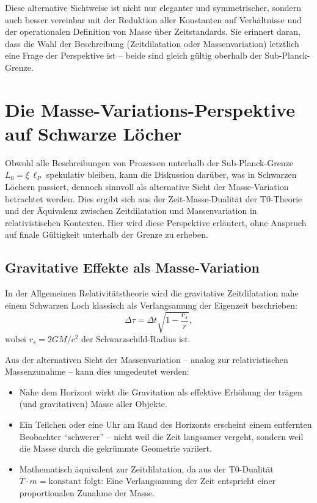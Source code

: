 Diese alternative Sichtweise ist nicht nur eleganter und symmetrischer, sondern auch besser vereinbar mit der Reduktion aller Konstanten auf Verhältnisse und der operationalen Definition von Masse über Zeitstandards. Sie erinnert daran, dass die Wahl der Beschreibung (Zeitdilatation oder Massenvariation) letztlich eine Frage der Perspektive ist – beide sind gleich gültig oberhalb der Sub-Planck-Grenze.
\section{Die Masse-Variations-Perspektive auf Schwarze Löcher}

Obwohl alle Beschreibungen von Prozessen unterhalb der Sub-Planck-Grenze \(L_0 = \xi \, \ell_P\) spekulativ bleiben, kann die Diskussion darüber, was in Schwarzen Löchern passiert, dennoch sinnvoll als alternative Sicht der Masse-Variation betrachtet werden. Dies ergibt sich aus der Zeit-Masse-Dualität der T0-Theorie und der Äquivalenz zwischen Zeitdilatation und Massenvariation in relativistischen Kontexten. Hier wird diese Perspektive erläutert, ohne Anspruch auf finale Gültigkeit unterhalb der Grenze zu erheben.

\subsection{Gravitative Effekte als Masse-Variation}

In der Allgemeinen Relativitätstheorie wird die gravitative Zeitdilatation nahe einem Schwarzen Loch klassisch als Verlangsamung der Eigenzeit beschrieben:
\[
\Delta \tau = \Delta t \sqrt{1 - \frac{r_s}{r}} ,
\]
wobei \(r_s = 2GM/c^2\) der Schwarzschild-Radius ist.

Aus der alternativen Sicht der Massenvariation – analog zur relativistischen Massenzunahme – kann dies umgedeutet werden:
\begin{itemize}
	\item Nahe dem Horizont wirkt die Gravitation als effektive Erhöhung der trägen (und gravitativen) Masse aller Objekte.
	\item Ein Teilchen oder eine Uhr am Rand des Horizonts erscheint einem entfernten Beobachter ``schwerer'' – nicht weil die Zeit langsamer vergeht, sondern weil die Masse durch die gekrümmte Geometrie variiert.
	\item Mathematisch äquivalent zur Zeitdilatation, da aus der T0-Dualität \(T \cdot m = \text{konstant}\) folgt: Eine Verlangsamung der Zeit entspricht einer proportionalen Zunahme der Masse.
\end{itemize}

